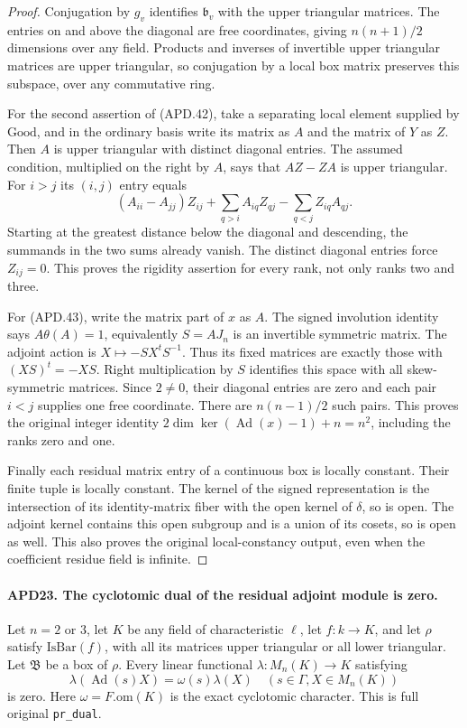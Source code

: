 \begin{proof}
Conjugation by \(g_v\) identifies \(\mathfrak b_v\) with
the upper triangular matrices.  The entries on and above the
diagonal are free coordinates, giving \(n(n+1)/2\) dimensions
over any field.  Products and inverses of invertible upper
triangular matrices are upper triangular, so conjugation by a
local box matrix preserves this subspace, over any commutative
ring.

For the second assertion of (APD.42), take a separating local
element supplied by \(\mathrm{Good}\), and in the ordinary
basis write its matrix as \(A\) and the matrix of \(Y\) as
\(Z\).  Then \(A\) is upper triangular with distinct
diagonal entries.  The assumed condition, multiplied on the
right by \(A\), says that \(AZ-ZA\) is upper triangular.
For \(i>j\) its \((i,j)\) entry equals
\[
 (A_{ii}-A_{jj})Z_{ij}
       +\sum_{q>i}A_{iq}Z_{qj}-\sum_{q<j}Z_{iq}A_{qj}.
\]
Starting at the greatest distance below the diagonal and
descending, the summands in the two sums already vanish.
The distinct diagonal entries force \(Z_{ij}=0\).  This
proves the rigidity assertion for every rank, not only ranks
two and three.

For (APD.43), write the matrix part of \(x\) as \(A\).
The signed involution identity says \(A\theta(A)=1\),
equivalently \(S=AJ_n\) is an invertible symmetric matrix.
The adjoint action is \(X\mapsto-SX^tS^{-1}\).
Thus its fixed matrices are exactly those with
\((XS)^t=-XS\).  Right multiplication by \(S\) identifies
this space with all skew-symmetric matrices.  Since \(2\ne0\),
their diagonal entries are zero and each pair \(i<j\) supplies
one free coordinate.  There are \(n(n-1)/2\) such pairs.
This proves the original integer identity
\(2\dim\ker(\operatorname{Ad}(x)-1)+n=n^2\), including
the ranks zero and one.

Finally each residual matrix entry of a continuous box is locally
constant.  Their finite tuple is locally constant.  The kernel
of the signed representation is the intersection of its
identity-matrix fiber with the open kernel of \(\delta\),
so is open.  The adjoint kernel contains this open subgroup
and is a union of its cosets, so is open as well.  This also
proves the original local-constancy output, even when the
coefficient residue field is infinite.
\end{proof}

\paragraph{APD23. The cyclotomic dual of the residual adjoint module is zero.}
\label{claim:APD23}
Let \(n=2\) or \(3\), let \(K\) be any field of
characteristic \(\ell\), let \(f:k\to K\), and let
\(\rho\) satisfy \(\mathrm{IsBar}(f)\), with all its
matrices upper triangular or all lower triangular.  Let
\(\mathfrak B\) be a box of \(\rho\).  Every linear
functional \(\lambda:M_n(K)\to K\) satisfying
\[
 \lambda(\operatorname{Ad}(s)X)
                   =\omega(s)\lambda(X)
                         \quad(s\in\Gamma,X\in M_n(K)) \tag{APD.44}
\]
is zero.  Here \(\omega=F.\mathrm{om}(K)\) is the exact
cyclotomic character.  This is full original \texttt{pr\_dual}.

